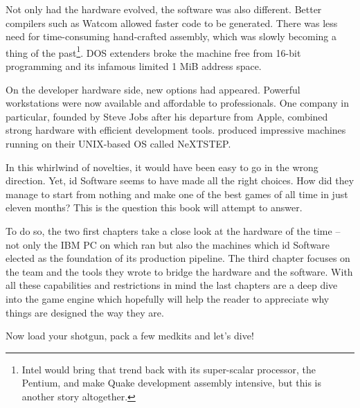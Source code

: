  Not only had the hardware evolved, the software was also different. Better compilers such as Watcom allowed faster code to be generated. There was less need for time-consuming hand-crafted assembly, which was slowly becoming a thing of the past\footnote{Intel would bring that trend back with its super-scalar processor, the Pentium, and make Quake development assembly intensive, but this is another story altogether.}. DOS extenders broke the machine free from 16-bit programming and its infamous limited 1 MiB address space.\\
 \par
 On the developer hardware side, new options had appeared. Powerful workstations were now available and affordable to professionals. One company in particular, founded by Steve Jobs after his departure from Apple, combined strong hardware with efficient development tools. \NeXT produced impressive machines running on their UNIX-based OS called NeXTSTEP.\\%
 \par
 In this whirlwind of novelties, it would have been easy to go in the wrong direction. Yet, id Software seems to have made all the right choices. How did they manage to start from nothing and make one of the best games of all time in just eleven months? This is the question this book will attempt to answer.\\
 \par
 To do so, the two first chapters take a close look at the hardware of the time -- not only the IBM PC on which \doom{} ran but also the \NeXT machines which id Software elected as the foundation of its production pipeline. The third chapter focuses on the team and the tools they wrote to bridge the hardware and the software. With all these capabilities and restrictions in mind the last chapters are a deep dive into the game engine which hopefully will help the reader to appreciate why things are designed the way they are.\\
\par
Now load your shotgun, pack a few medkits and let's dive!\\
\par
\par
{
\setlength{\abovecaptionskip}{15pt}
}

